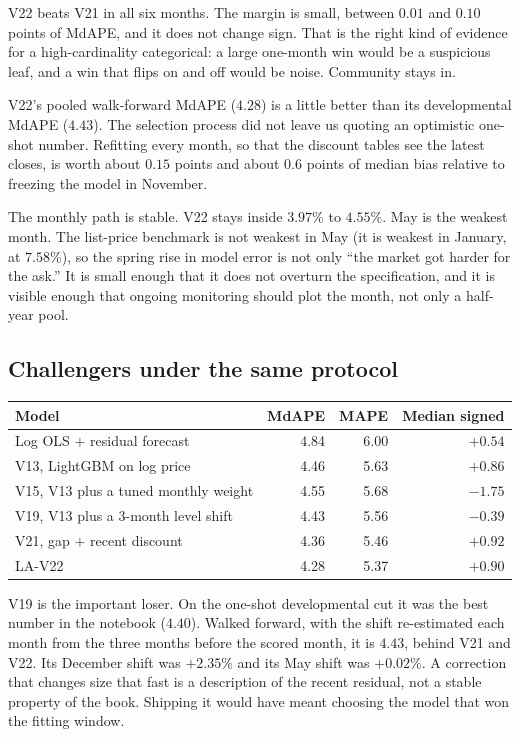 \documentclass[11pt]{article}
\newcommand{\modelid}{LA-V22}
\begin{document}
V22 beats V21 in all six months. The margin is small, between \(0.01\) and \(0.10\) points of MdAPE, and it does not change sign. That is the right kind of evidence for a high-cardinality categorical: a large one-month win would be a suspicious leaf, and a win that flips on and off would be noise. Community stays in.

V22's pooled walk-forward MdAPE (\(4.28\)) is a little better than its developmental MdAPE (\(4.43\)). The selection process did not leave us quoting an optimistic one-shot number. Refitting every month, so that the discount tables see the latest closes, is worth about \(0.15\) points and about \(0.6\) points of median bias relative to freezing the model in November.

The monthly path is stable. V22 stays inside \(3.97\%\) to \(4.55\%\). May is the weakest month. The list-price benchmark is not weakest in May (it is weakest in January, at \(7.58\%\)), so the spring rise in model error is not only ``the market got harder for the ask.'' It is small enough that it does not overturn the specification, and it is visible enough that ongoing monitoring should plot the month, not only a half-year pool.

\subsection{Challengers under the same protocol}
\label{sec:challengers}

\begin{center}
\begin{tabular}{lrrr}
\toprule
Model & MdAPE & MAPE & Median signed \\
\midrule
Log OLS \(+\) residual forecast & 4.84 & 6.00 & \(+0.54\) \\
V13, LightGBM on log price & 4.46 & 5.63 & \(+0.86\) \\
V15, V13 plus a tuned monthly weight & 4.55 & 5.68 & \(-1.75\) \\
V19, V13 plus a 3-month level shift & 4.43 & 5.56 & \(-0.39\) \\
V21, gap \(+\) recent discount & 4.36 & 5.46 & \(+0.92\) \\
\modelid{} & 4.28 & 5.37 & \(+0.90\) \\
\bottomrule
\end{tabular}
\end{center}

V19 is the important loser. On the one-shot developmental cut it was the best number in the notebook (\(4.40\)). Walked forward, with the shift re-estimated each month from the three months before the scored month, it is \(4.43\), behind V21 and V22. Its December shift was \(+2.35\%\) and its May shift was \(+0.02\%\). A correction that changes size that fast is a description of the recent residual, not a stable property of the book. Shipping it would have meant choosing the model that won the fitting window.
\end{document}
